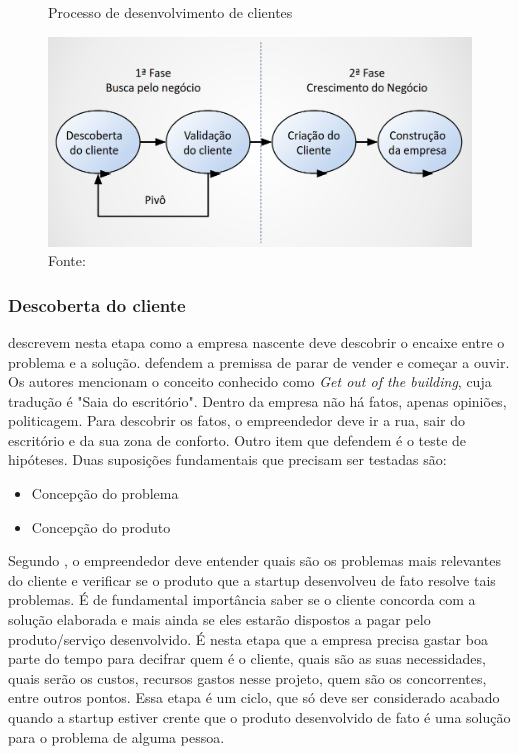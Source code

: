\begin{figure}[H]
\caption{Processo de desenvolvimento de clientes}
\centerline{\includegraphics[scale=0.3]{img/desenvolvimento_de_clientes}}
\label{fig:desenvolvimento_de_clientes}
\caption* {Fonte: }
\end{figure}

\subsubsection{Descoberta do cliente}
\label{cha:descoberta_do_cliente}
 descrevem nesta etapa como a empresa nascente deve descobrir o encaixe entre o problema e a solução.
 defendem a premissa de parar de vender e começar a ouvir. Os autores mencionam o conceito conhecido como \textit{Get out of the building}, cuja tradução é "Saia do escritório". Dentro da empresa não há fatos, apenas opiniões, politicagem. Para descobrir os fatos, o empreendedor deve ir a rua, sair do escritório e da sua zona de conforto.
Outro item que  defendem é o teste de hipóteses. Duas suposições fundamentais que precisam ser testadas são: 
\begin{itemize}
\item Concepção do problema
\item Concepção do produto
\end{itemize}

Segundo , o empreendedor deve entender quais são os problemas mais relevantes do cliente e verificar se o produto que a startup desenvolveu de fato resolve tais problemas. É de fundamental importância saber se o cliente concorda com a solução elaborada e mais ainda se eles estarão dispostos a pagar pelo produto/serviço desenvolvido. É nesta etapa que a empresa precisa gastar boa parte do tempo para decifrar quem é o cliente, quais são as suas necessidades, quais serão os custos, recursos gastos nesse projeto, quem são os concorrentes, entre outros pontos. Essa etapa é um ciclo, que só deve ser considerado acabado quando a startup estiver crente que o produto desenvolvido de fato é uma solução para o problema de alguma pessoa.

